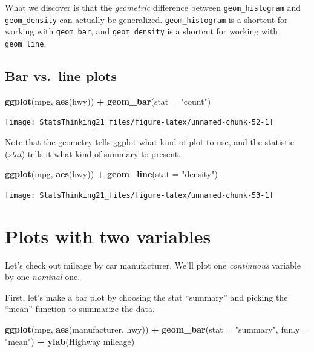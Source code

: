 \documentclass[
  12pt,
]{book}
\newenvironment{Shaded}{\begin{snugshade}}{\end{snugshade}}
\newcommand{\AttributeTok}[1]{\textcolor[rgb]{0.13,0.29,0.53}{#1}}
\newcommand{\FunctionTok}[1]{\textcolor[rgb]{0.13,0.29,0.53}{\textbf{#1}}}
\newcommand{\NormalTok}[1]{#1}
\newcommand{\SpecialCharTok}[1]{\textcolor[rgb]{0.81,0.36,0.00}{\textbf{#1}}}
\newcommand{\StringTok}[1]{\textcolor[rgb]{0.31,0.60,0.02}{#1}}
\begin{document}
What we discover is that the \emph{geometric} difference between \texttt{geom\_histogram} and \texttt{geom\_density} can actually be generalized. \texttt{geom\_histogram} is a shortcut for working with \texttt{geom\_bar}, and \texttt{geom\_density} is a shortcut for working with \texttt{geom\_line}.

\hypertarget{bar-vs.-line-plots}{%
\subsection{Bar vs.~line plots}\label{bar-vs.-line-plots}}

\begin{Shaded}
\begin{Highlighting}[]
\FunctionTok{ggplot}\NormalTok{(mpg, }\FunctionTok{aes}\NormalTok{(hwy)) }\SpecialCharTok{+}
  \FunctionTok{geom\_bar}\NormalTok{(}\AttributeTok{stat =} \StringTok{"count"}\NormalTok{)}
\end{Highlighting}
\end{Shaded}

\texttt{[image: StatsThinking21\_files/figure-latex/unnamed-chunk-52-1]}

Note that the geometry tells ggplot what kind of plot to use, and the statistic (\emph{stat}) tells it what kind of summary to present.

\begin{Shaded}
\begin{Highlighting}[]
\FunctionTok{ggplot}\NormalTok{(mpg, }\FunctionTok{aes}\NormalTok{(hwy)) }\SpecialCharTok{+}
  \FunctionTok{geom\_line}\NormalTok{(}\AttributeTok{stat =} \StringTok{"density"}\NormalTok{)}
\end{Highlighting}
\end{Shaded}

\texttt{[image: StatsThinking21\_files/figure-latex/unnamed-chunk-53-1]}

\hypertarget{plots-with-two-variables}{%
\section{Plots with two variables}\label{plots-with-two-variables}}

Let's check out mileage by car manufacturer. We'll plot one \emph{continuous} variable by one \emph{nominal} one.

First, let's make a bar plot by choosing the stat ``summary'' and picking the ``mean'' function to summarize the data.

\begin{Shaded}
\begin{Highlighting}[]
\FunctionTok{ggplot}\NormalTok{(mpg, }\FunctionTok{aes}\NormalTok{(manufacturer, hwy)) }\SpecialCharTok{+}
  \FunctionTok{geom\_bar}\NormalTok{(}\AttributeTok{stat =} \StringTok{"summary"}\NormalTok{, }\AttributeTok{fun.y =} \StringTok{"mean"}\NormalTok{)  }\SpecialCharTok{+} 
  \FunctionTok{ylab}\NormalTok{(}\StringTok{\textquotesingle{}Highway mileage\textquotesingle{}}\NormalTok{)}
\end{Highlighting}
\end{Shaded}
\end{document}
